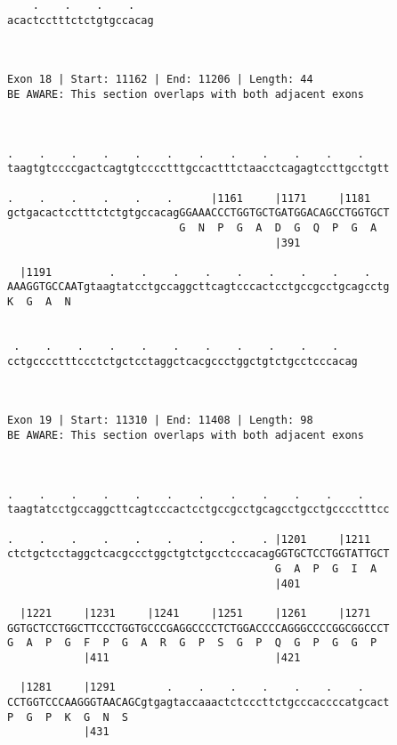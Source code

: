 \documentclass{article}
\begin{document}
\begin{Verbatim}
    .    .    .    .   
acactcctttctctgtgccacag
                       
                       
 
Exon 18 | Start: 11162 | End: 11206 | Length: 44
BE AWARE: This section overlaps with both adjacent exons



.    .    .    .    .    .    .    .    .    .    .    .    
taagtgtccccgactcagtgtcccctttgccactttctaacctcagagtccttgcctgtt
                                                            
.    .    .    .    .    .      |1161     |1171     |1181   
gctgacactcctttctctgtgccacagGGAAACCCTGGTGCTGATGGACAGCCTGGTGCT
                           G  N  P  G  A  D  G  Q  P  G  A  
                                          |391              
  
  |1191         .    .    .    .    .    .    .    .    .   
AAAGGTGCCAATgtaagtatcctgccaggcttcagtcccactcctgccgcctgcagcctg
K  G  A  N                                                  
                                                            
  
 .    .    .    .    .    .    .    .    .    .    .   
cctgcccctttccctctgctcctaggctcacgccctggctgtctgcctcccacag
                                                       
                                                       
 
Exon 19 | Start: 11310 | End: 11408 | Length: 98
BE AWARE: This section overlaps with both adjacent exons



.    .    .    .    .    .    .    .    .    .    .    .    
taagtatcctgccaggcttcagtcccactcctgccgcctgcagcctgcctgcccctttcc
                                                            
.    .    .    .    .    .    .    .    . |1201     |1211   
ctctgctcctaggctcacgccctggctgtctgcctcccacagGGTGCTCCTGGTATTGCT
                                          G  A  P  G  I  A  
                                          |401              
  
  |1221     |1231     |1241     |1251     |1261     |1271   
GGTGCTCCTGGCTTCCCTGGTGCCCGAGGCCCCTCTGGACCCCAGGGCCCCGGCGGCCCT
G  A  P  G  F  P  G  A  R  G  P  S  G  P  Q  G  P  G  G  P  
            |411                          |421              
  
  |1281     |1291        .    .    .    .    .    .    .    
CCTGGTCCCAAGGGTAACAGCgtgagtaccaaactctcccttctgcccaccccatgcact
P  G  P  K  G  N  S                                         
            |431                                            
  

\end{Verbatim}
\end{document}
